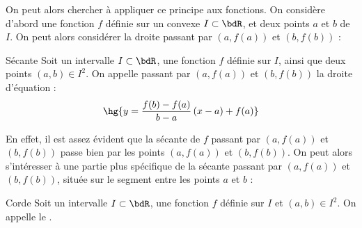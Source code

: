 \documentclass[a4paper,french,bookmarks]{report}
\begin{document}
On peut alors chercher à appliquer ce principe aux fonctions. On considère d'abord une fonction $f$ définie sur un convexe $I \subset \bdR$, et deux points $a$ et $b$ de $I$. On peut alors considérer la droite passant par $\left(a, f(a)\right)$ et $\left(b, f(b)\right)$ :

\begin{definition}{Sécante}{}
    Soit un intervalle $I \subset \bdR$, une fonction $f$ définie sur $I$, ainsi que deux points $(a, b) \in I^2$. On appelle  passant par $\left(a, f(a)\right)$ et $\left(b, f(b)\right)$ la droite d'équation :
    \[ \hg{y = \dfrac{f(b)-f(a)}{b-a}\left(x - a\right) + f(a)}\]
\end{definition}

En effet, il est assez évident que la sécante de $f$ passant par $\left(a, f(a)\right)$ et $\left(b, f(b)\right)$ passe bien par les points $\left(a, f(a)\right)$ et $\left(b, f(b)\right)$. On peut alors s'intéresser à une partie plus spécifique de la sécante passant par $\left(a, f(a)\right)$ et $\left(b, f(b)\right)$, située sur le segment entre les points $a$ et $b$ :
    
\begin{definition}{Corde}{}
    Soit un intervalle $I \subset \bdR$, une fonction $f$ définie sur $I$ et $(a, b) \in I^2$. On appelle  le .
\end{definition}
\end{document}
